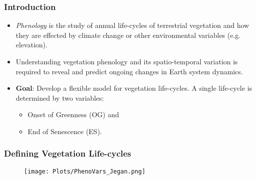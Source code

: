 

\begin{frame}
\frametitle{Introduction}
\begin{itemize}
\item \emph{Phenology} is the study of annual life-cycles of terrestrial vegetation and how they are effected by climate change or other environmental variables (e.g. elevation). 

\item Understanding vegetation phenology and its spatio-temporal variation is required to reveal and predict ongoing changes in Earth system dynamics. \\[0.5cm]

\item \textbf{Goal}: Develop a flexible model for vegetation life-cycles.  A single life-cycle is determined by two variables: 
\begin{itemize} 
\item Onset of Greenness (OG) and 
\item End of Senescence (ES).
\end{itemize}
\end{itemize}
\end{frame}

\frame
{
\frametitle{Defining Vegetation Life-cycles}
\begin{figure}
   \begin{center}
   \texttt{[image: Plots/PhenoVars\_Jegan.png]} 
\end{center}
\end{figure}
}

